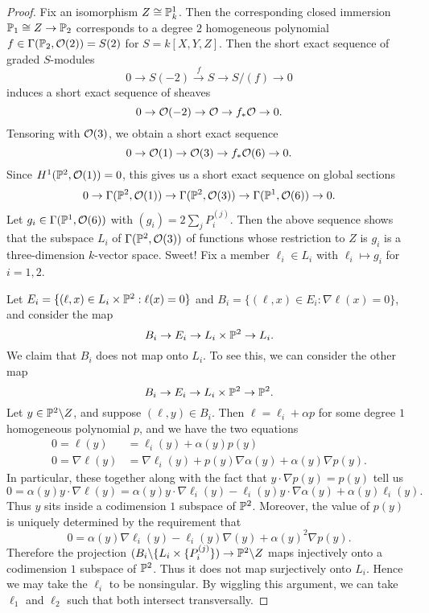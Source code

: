 \begin{proof}
Fix an isomorphism $Z\cong\mathbb{P}^1_k$.  Then the corresponding closed immersion $\mathbb{P}_1\cong Z\rightarrow\mathbb{P}_2$ corresponds to a degree $2$ homogeneous polynomial $f\in\Gamma(\mathbb{P}_2,\mathcal{O}(2)) = S(2)$ for $S = k[X,Y,Z]$.  Then the short exact sequence of graded $S$-modules
$$0\rightarrow S(-2)\xrightarrow{f} S\rightarrow S/(f)\rightarrow 0$$
induces a short exact sequence of sheaves
$$0\rightarrow \mathcal{O}(-2)\rightarrow \mathcal{O}\rightarrow f_*\mathcal{O}\rightarrow 0.$$
Tensoring with $\mathcal{O}(3)$, we obtain a short exact sequence
$$0\rightarrow \mathcal{O}(1)\rightarrow \mathcal{O}(3)\rightarrow f_*\mathcal{O}(6)\rightarrow 0.$$
Since $H^1(\mathbb{P}^2,\mathcal{O}(1)) = 0$, this gives us a short exact sequence on global sections
$$0\rightarrow \Gamma(\mathbb{P}^2,\mathcal{O}(1))\rightarrow \Gamma(\mathbb{P}^2,\mathcal{O}(3))\rightarrow \Gamma(\mathbb{P}^1,\mathcal{O}(6))\rightarrow 0.$$
Let $g_i\in\Gamma(\mathbb{P}^1,\mathcal{O}(6))$ with $(g_i) = 2\sum_j P^{(j)}_i$.  Then the above sequence shows that the subspace $L_i$ of $\Gamma(\mathbb{P}^2,\mathcal{O}(3))$ of functions whose restriction to $Z$ is $g_i$ is a three-dimension $k$-vector space.  Sweet!  Fix a member $\ell_i\in L_i$ with $\ell_i\mapsto g_i$ for $i=1,2$.

Let $E_i = \{(\ell,x)\in L_i\times\mathbb{P}^2: \ell(x) = 0\}$ and $B_i = \{(\ell,x)\in E_i: \nabla \ell(x) = 0\}$, and consider the map
$$B_i\rightarrow E_i\rightarrow L_i\times\mathbb{P}^2\rightarrow L_i.$$
We claim that $B_i$ does not map onto $L_i$.  To see this, we can consider the other map
$$B_i\rightarrow E_i\rightarrow L_i\times\mathbb{P}^2\rightarrow \mathbb{P}^2.$$
Let $y\in \mathbb{P}^2\backslash Z$, and suppose $(\ell,y)\in B_i$.  Then $\ell = \ell_i + \alpha p$ for some degree $1$ homogeneous polynomial $p$, and
we have the two equations
\begin{align*}
0 = \ell(y)       & = \ell_i(y) + \alpha(y)p(y)\\
0 = \nabla\ell(y) & = \nabla\ell_i(y) + p(y)\nabla\alpha(y)  + \alpha(y)\nabla p(y).
\end{align*}
In particular, these together along with the fact that $y\cdot\nabla p(y) = p(y)$ tell us
$$0 = \alpha(y)y\cdot\nabla\ell(y) = \alpha(y)y\cdot\nabla\ell_i(y) -\ell_i(y)y\cdot\nabla\alpha(y) + \alpha(y)\ell_i(y).$$
Thus $y$ sits inside a codimension $1$ subspace of $\mathbb{P}^2$.  Moreover, the value of $p(y)$ is uniquely determined by the requirement that
$$0 = \alpha(y)\nabla\ell_i(y) - \ell_i(y)\nabla(y) + \alpha(y)^2\nabla p(y).$$
Therefore the projection $(B_i\backslash \{L_i\times\{P_i^{(j)}\})\rightarrow \mathbb{P}^2\backslash Z$ maps injectively onto a codimension $1$ subspace of $\mathbb{P}^2$.  Thus it does not map surjectively onto $L_i$.  Hence we may take the $\ell_i$ to be nonsingular.  By wiggling this argument, we can take $\ell_1$ and $\ell_2$ such that both intersect transversally.
\end{proof}

